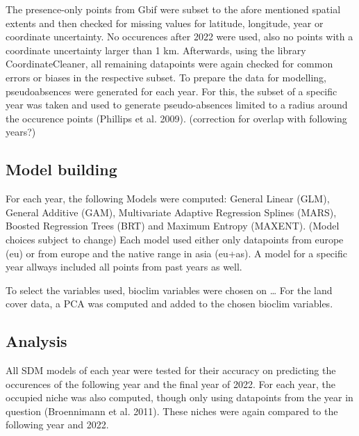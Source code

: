 \documentclass[11pt,a4paper]{article}
\begin{document}
The presence-only points from Gbif were subset to the afore mentioned spatial extents and then checked for missing values for latitude, longitude, year or coordinate uncertainty. 
No occurences after 2022 were used, also no points with a coordinate uncertainty larger than 1 km. 
Afterwards, using the library CoordinateCleaner, all remaining datapoints were again checked for common errors or biases in the respective subset.
To prepare the data for modelling, pseudoabsences were generated for each year. For this, the subset of a specific year was taken and used to generate pseudo-absences limited to a radius around the occurence points (Phillips et al. 2009). (correction for overlap with following years?)

\subsection{Model building}
For each year, the following Models were computed: General Linear (GLM), General Additive (GAM), Multivariate Adaptive Regression Splines (MARS), Boosted Regression Trees (BRT) and Maximum Entropy (MAXENT). 
(Model choices subject to change)
Each model used either only datapoints from europe (eu) or from europe and the native range in asia (eu+as). 
A model for a specific year allways included all points from past years as well.

To select the variables used, bioclim variables were chosen on \dots 
For the land cover data, a PCA was computed and added to the chosen bioclim variables.

\subsection{Analysis}
All SDM models of each year were tested for their accuracy on predicting the occurences of the following year and the final year of 2022. 
For each year, the occupied niche was also computed, though only using datapoints from the year in question (Broennimann et al. 2011). 
These niches were again compared to the following year and 2022.
\end{document}
